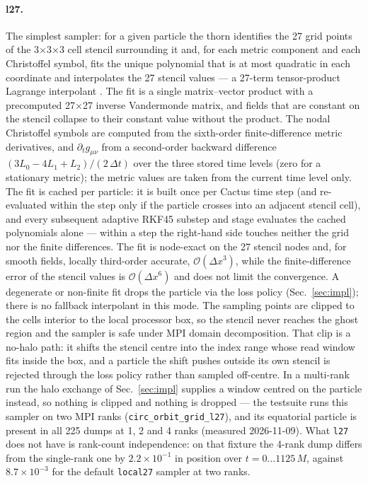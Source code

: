 \documentclass[11pt]{article}
\begin{document}
\paragraph{l27.}
The simplest sampler: for a given particle the thorn identifies the 27
grid points of the 3$\times$3$\times$3 cell stencil surrounding it and,
for each metric component and each Christoffel symbol, fits the unique
polynomial that is at most quadratic in each coordinate and interpolates
the 27 stencil values --- a 27-term tensor-product Lagrange interpolant
\citep{berrut2004}.  The fit is a single matrix--vector product with a
precomputed 27$\times$27 inverse Vandermonde matrix, and fields that are
constant on the stencil collapse to their constant value without the
product.  The nodal Christoffel symbols are computed from the sixth-order
finite-difference metric derivatives, and $\partial_t g_{\mu\nu}$ from a
second-order backward difference $(3L_0-4L_1+L_2)/(2\,\Delta t)$ over the
three stored time levels (zero for a stationary metric); the metric values
are taken from the current time level only.  The fit is cached per
particle: it is built once per Cactus time step (and re-evaluated within
the step only if the particle crosses into an adjacent stencil cell), and
every subsequent adaptive RKF45 substep and stage evaluates the cached
polynomials alone --- within a step the right-hand side touches neither
the grid nor the finite differences.  The fit is node-exact on the 27
stencil nodes and, for smooth fields, locally third-order accurate,
$\mathcal{O}(\Delta x^3)$, while the finite-difference error of the
stencil values is $\mathcal{O}(\Delta x^6)$ and does not limit the
convergence.  A degenerate or non-finite fit drops the particle via the
loss policy (Sec.~\ref{sec:impl}); there is no fallback interpolant in
this mode.  The sampling points are clipped to the cells interior to the
local processor box, so the stencil never reaches the ghost region and the
sampler is safe under MPI domain decomposition.  That clip is a no-halo
path: it shifts the stencil centre into the index range whose read window
fits inside the box, and a particle the shift pushes outside its own
stencil is rejected through the loss policy rather than sampled off-centre.
In a multi-rank run the halo exchange of Sec.~\ref{sec:impl} supplies a
window centred on the particle instead, so nothing is clipped and nothing
is dropped --- the testsuite runs this sampler on two MPI ranks
(\texttt{circ\_orbit\_grid\_l27}), and its equatorial particle is present in
all 225 dumps at 1, 2 and 4 ranks (measured 2026-11-09).  What
\texttt{l27} does not have is rank-count independence: on that fixture the
4-rank dump differs from the single-rank one by $2.2\times10^{-1}$ in
position over $t = 0 \ldots 1125\,M$, against $8.7\times10^{-3}$ for the
default \texttt{local27} sampler at two ranks.
\end{document}
